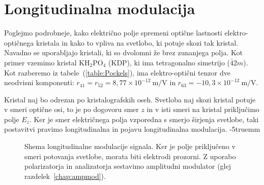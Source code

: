\section{Longitudinalna modulacija}
Poglejmo podrobneje, kako električno polje spremeni optične lastnosti 
elektro-optičnega kristala in kako to vpliva na svetlobo, ki potuje skozi tak kristal.
Navadno se uporabljajo kristali, ki so dvolomni že brez zunanjega polja. 
Kot primer vzemimo kristal KH$_{2}$PO$_{4}$ (KDP), ki ima tetragonalno 
simetrijo ($\bar{4}2m$). Kot razberemo iz tabele~(\ref{table:Pockels}), ima 
elektro-optični tenzor dve neodvisni komponenti: $r_{41} = r_{52}=8,77 \times 10^{-12}~\si{\m/\V}$
in $r_{63}= -10,3 \times 10^{-12}~\si{\m/\V}$.

Kristal naj bo odrezan po kristalografskih oseh. Svetloba naj skozi kristal potuje 
v smeri optične osi, to je po dogovoru smer $z$ in v isti smeri na kristal priključimo
polje $E_z$. Ker je smer električnega polja vzporedna s smerjo širjenja svetlobe, taki 
postavitvi pravimo longitudinalna in pojavu longitudinalna 
modulacija. 
\vglue-5truemm
\begin{figure}[h]
\centering
\def\svgwidth{80truemm} 

\caption{Shema longitudinalne modulacije signala. Ker je polje priključeno v smeri
potovanja svetlobe, morata biti elektrodi prozorni. Z uporabo polarizatorja in 
analizatorja sestavimo amplitudni modulator (glej razdelek~\ref{chap:ampmod}).}
\label{fig:amshema}
\end{figure}

